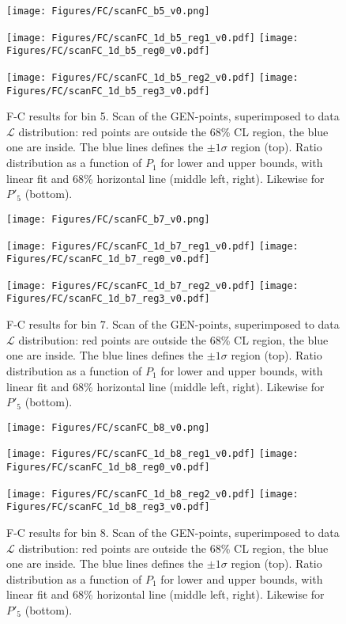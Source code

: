 \begin{figure}
  \centering
  \texttt{[image: Figures/FC/scanFC\_b5\_v0.png]}

  \texttt{[image: Figures/FC/scanFC\_1d\_b5\_reg1\_v0.pdf]}
  \texttt{[image: Figures/FC/scanFC\_1d\_b5\_reg0\_v0.pdf]}

  \texttt{[image: Figures/FC/scanFC\_1d\_b5\_reg2\_v0.pdf]}
  \texttt{[image: Figures/FC/scanFC\_1d\_b5\_reg3\_v0.pdf]}

  \caption{F-C results for bin 5.
    Scan of the GEN-points, superimposed to data $\mathcal{L}$ distribution: red points are outside the 68\% CL region, the blue one are inside.
    The blue lines defines the $\pm1\sigma$ region (top).
    Ratio distribution as a function of $P_1$ for lower and upper bounds, with linear fit and 68\% horizontal line (middle left, right).
    Likewise for $P'_5$ (bottom).}
  \label{fig:FC5}
\end{figure}

\begin{figure}
  \centering
  \texttt{[image: Figures/FC/scanFC\_b7\_v0.png]}

  \texttt{[image: Figures/FC/scanFC\_1d\_b7\_reg1\_v0.pdf]}
  \texttt{[image: Figures/FC/scanFC\_1d\_b7\_reg0\_v0.pdf]}

  \texttt{[image: Figures/FC/scanFC\_1d\_b7\_reg2\_v0.pdf]}
  \texttt{[image: Figures/FC/scanFC\_1d\_b7\_reg3\_v0.pdf]}

  \caption{F-C results for bin 7.
    Scan of the GEN-points, superimposed to data $\mathcal{L}$ distribution: red points are outside the 68\% CL region, the blue one are inside.
    The blue lines defines the $\pm1\sigma$ region (top).
    Ratio distribution as a function of $P_1$ for lower and upper bounds, with linear fit and 68\% horizontal line (middle left, right).
    Likewise for $P'_5$ (bottom).}
  \label{fig:FC7}
\end{figure}

\begin{figure}
  \centering
  \texttt{[image: Figures/FC/scanFC\_b8\_v0.png]}

  \texttt{[image: Figures/FC/scanFC\_1d\_b8\_reg1\_v0.pdf]}
  \texttt{[image: Figures/FC/scanFC\_1d\_b8\_reg0\_v0.pdf]}

  \texttt{[image: Figures/FC/scanFC\_1d\_b8\_reg2\_v0.pdf]}
  \texttt{[image: Figures/FC/scanFC\_1d\_b8\_reg3\_v0.pdf]}

  \caption{F-C results for bin 8.
    Scan of the GEN-points, superimposed to data $\mathcal{L}$ distribution: red points are outside the 68\% CL region, the blue one are inside.
    The blue lines defines the $\pm1\sigma$ region (top).
    Ratio distribution as a function of $P_1$ for lower and upper bounds, with linear fit and 68\% horizontal line (middle left, right).
    Likewise for $P'_5$ (bottom).}
  \label{fig:FC8}
\end{figure}

